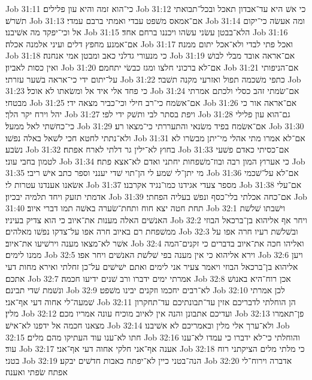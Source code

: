 Job 31:11  כי־הוא זמה והיא עון פלילים׃
Job 31:12  כי אשׁ היא עד־אבדון תאכל ובכל־תבואתי תשׁרשׁ׃
Job 31:13  אם־אמאס משׁפט עבדי ואמתי ברבם עמדי׃
Job 31:14  ומה אעשׂה כי־יקום אל וכי־יפקד מה אשׁיבנו׃
Job 31:15  הלא־בבטן עשׂני עשׂהו ויכננו ברחם אחד׃
Job 31:16  אם־אמנע מחפץ דלים ועיני אלמנה אכלה׃
Job 31:17  ואכל פתי לבדי ולא־אכל יתום ממנה׃
Job 31:18  כי מנעורי גדלני כאב ומבטן אמי אנחנה׃
Job 31:19  אם־אראה אובד מבלי לבושׁ ואין כסות לאביון׃
Job 31:20  אם־לא ברכוני חלצו ומגז כבשׂי יתחמם׃
Job 31:21  אם־הניפותי על־יתום ידי כי־אראה בשׁער עזרתי׃
Job 31:22  כתפי משׁכמה תפול ואזרעי מקנה תשׁבר׃
Job 31:23  כי פחד אלי איד אל ומשׂאתו לא אוכל׃
Job 31:24  אם־שׂמתי זהב כסלי ולכתם אמרתי מבטחי׃
Job 31:25  אם־אשׂמח כי־רב חילי וכי־כביר מצאה ידי׃
Job 31:26  אם־אראה אור כי יהל וירח יקר הלך׃
Job 31:27  ויפת בסתר לבי ותשׁק ידי לפי׃
Job 31:28  גם־הוא עון פלילי כי־כחשׁתי לאל ממעל׃
Job 31:29  אם־אשׂמח בפיד משׂנאי והתעררתי כי־מצאו רע׃
Job 31:30  ולא־נתתי לחטא חכי לשׁאל באלה נפשׁו׃
Job 31:31  אם־לא אמרו מתי אהלי מי־יתן מבשׂרו לא נשׂבע׃
Job 31:32  בחוץ לא־ילין גר דלתי לארח אפתח׃
Job 31:33  אם־כסיתי כאדם פשׁעי לטמון בחבי עוני׃
Job 31:34  כי אערוץ המון רבה ובוז־משׁפחות יחתני ואדם לא־אצא פתח׃
Job 31:35  מי יתן־לי שׁמע לי הן־תוי שׁדי יענני וספר כתב אישׁ ריבי׃
Job 31:36  אם־לא על־שׁכמי אשׂאנו אענדנו עטרות לי׃
Job 31:37  מספר צעדי אגידנו כמו־נגיד אקרבנו׃
Job 31:38  אם־עלי אדמתי תזעק ויחד תלמיה יבכיון׃
Job 31:39  אם־כחה אכלתי בלי־כסף ונפשׁ בעליה הפחתי׃
Job 31:40  תחת חטה יצא חוח ותחת־שׂערה באשׁה תמו דברי איוב׃
Job 32:1  וישׁבתו שׁלשׁת האנשׁים האלה מענות את־איוב כי הוא צדיק בעיניו׃
Job 32:2  ויחר אף אליהוא בן־ברכאל הבוזי ממשׁפחת רם באיוב חרה אפו על־צדקו נפשׁו מאלהים׃
Job 32:3  ובשׁלשׁת רעיו חרה אפו על אשׁר לא־מצאו מענה וירשׁיעו את־איוב׃
Job 32:4  ואליהו חכה את־איוב בדברים כי זקנים־המה ממנו לימים׃
Job 32:5  וירא אליהוא כי אין מענה בפי שׁלשׁת האנשׁים ויחר אפו׃
Job 32:6  ויען אליהוא בן־ברכאל הבוזי ויאמר צעיר אני לימים ואתם ישׁישׁים על־כן זחלתי ואירא מחות דעי אתכם׃
Job 32:7  אמרתי ימים ידברו ורב שׁנים ידיעו חכמה׃
Job 32:8  אכן רוח־היא באנושׁ ונשׁמת שׁדי תבינם׃
Job 32:9  לא־רבים יחכמו וזקנים יבינו משׁפט׃
Job 32:10  לכן אמרתי שׁמעה־לי אחוה דעי אף־אני׃
Job 32:11  הן הוחלתי לדבריכם אזין עד־תבונתיכם עד־תחקרון מלין׃
Job 32:12  ועדיכם אתבונן והנה אין לאיוב מוכיח עונה אמריו מכם׃
Job 32:13  פן־תאמרו מצאנו חכמה אל ידפנו לא־אישׁ׃
Job 32:14  ולא־ערך אלי מלין ובאמריכם לא אשׁיבנו׃
Job 32:15  חתו לא־ענו עוד העתיקו מהם מלים׃
Job 32:16  והוחלתי כי־לא ידברו כי עמדו לא־ענו עוד׃
Job 32:17  אענה אף־אני חלקי אחוה דעי אף־אני׃
Job 32:18  כי מלתי מלים הציקתני רוח בטני׃
Job 32:19  הנה־בטני כיין לא־יפתח כאבות חדשׁים יבקע׃
Job 32:20  אדברה וירוח־לי אפתח שׂפתי ואענה׃
